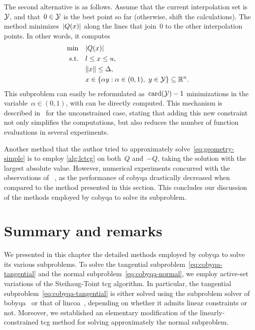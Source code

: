 The second alternative is as follows.
Assume that the current interpolation set is~$\xpt$, and that~$0 \in \xpt$ is the best point so far (otherwise, shift the calculations).
The method minimizes~$\abs{Q(\iter)}$ along the lines that join~$0$ to the other interpolation points.
In other words, it computes
\begin{align*}
    \min        & \quad \abs{Q(\iter)}\\
    \text{s.t.} & \quad \xl \le \iter \le \xu,\\
                & \quad \norm{\iter} \le \rad,\\
                & \quad \iter \in \set{\alpha y : \alpha \in (0, 1), ~ y \in \xpt} \subseteq \R^n.
\end{align*}
This subproblem can easily be reformulated as~$\card(\xpt) - 1$ minimizations in the variable~$\alpha \in (0, 1)$, with can be directly computed.
This mechanism is described in~\cite{Powell_2008} for the unconstrained case, stating that adding this new constraint not only simplifies the computations, but also reduces the number of function evaluations in several experiments.

Another method that the author tried to approximately solve~\cref{eq:geometry-simple} is to employ \cref{alg:lctcg} on both~$Q$ and~$-Q$, taking the solution with the largest absolute value.
However, numerical experiments concurred with the observations of \citeauthor{Powell_2008}~\cite{Powell_2008}, as the performance of \gls{cobyqa} drastically decreased when compared to the method presented in this section.
This concludes our discussion of the methods employed by \gls{cobyqa} to solve its subproblem.

\section{Summary and remarks}

We presented in this chapter the detailed methods employed by \gls{cobyqa} to solve its various subproblems.
To solve the tangential subproblem~\cref{eq:cobyqa-tangential} and the normal subproblem~\cref{eq:cobyqa-normal}, we employ active-set variations of the Steihaug-Toint \gls{tcg} algorithm.
In particular, the tangential subproblem~\cref{eq:cobyqa-tangential} is either solved using the subproblem solver of \gls{bobyqa}~\cite{Powell_2009} or that of \gls{lincoa}~\cite{Powell_2015}, depending on whether it admits linear constraints or not.
Moreover, we established an elementary modification of the linearly-constrained \gls{tcg} method for solving approximately the normal subproblem.

